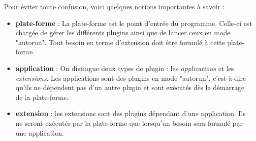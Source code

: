 \documentclass[11pt]{article}
\begin{document}
    Pour éviter toute confusion, voici quelques notions importantes à savoir :
    \begin{itemize}
        \item \textbf{plate-forme} : La plate-forme est le point d'entrée du programme. Celle-ci est chargée de gérer les différents plugins ainsi que de lancer ceux en mode "autorun". Tout besoin en terme d'extension doit être formulé à cette plate-forme.
        
        \item \textbf{application} : On distingue deux types de plugin : les \textit{applications} et les \textit{extensions}. Les applications sont des plugins en mode "autorun", c'est-à-dire qu'ils ne dépendent pas d'un autre plugin et sont exécutés dès le démarrage de la plate-forme.
        
        \item \textbf{extension} : les extensions sont des plugins dépendant d'une application. Ils ne seront exécutés par la plate-forme que lorsqu'un besoin sera formulé par une application.
    \end{itemize}




\end{document}
